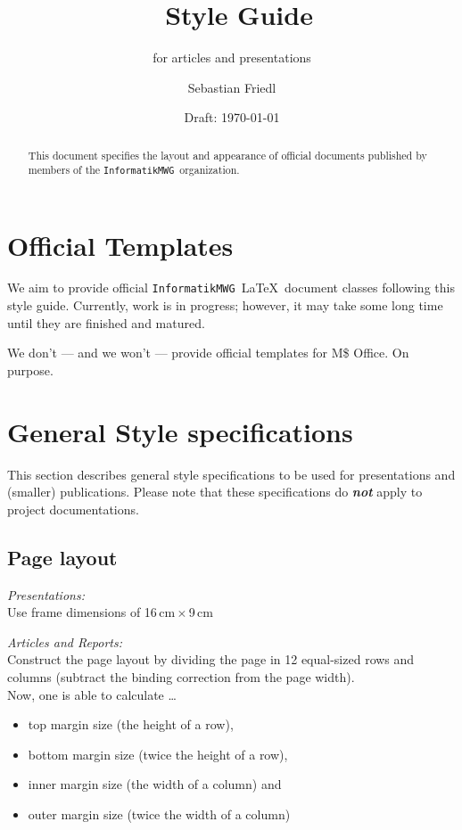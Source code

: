 \documentclass[DIV=12,abstracton]{scrartcl}
\title{\informatikMWG\ Style Guide}
\subtitle{for articles and presentations}
\author{Sebastian Friedl}
\date{Draft: \today}
\def\informatikMWG{\texttt{InformatikMWG}}
\begin{document}
    \maketitle

    \begin{abstract}
        This document specifies the layout and appearance of official documents published by members of the \informatikMWG\ organization.
    \end{abstract}
    
    \bigskip\bigskip\bigskip
    
    \section{Official Templates}
    We aim to provide official \informatikMWG\ \LaTeX\ document classes following this style guide. Currently, work is in progress; however, it may take some long time until they are finished and matured.

    \medskip
    We don't --- and we won't --- provide official templates for M\$ Office. On purpose.
    
    
    \section{General Style specifications}
    This section describes general style specifications to be used for presentations and (smaller) publications.
    Please note that these specifications do \emph{\textbf{not}} apply to project documentations.
    
    \subsection{Page layout}
    \textit{Presentations:} \\
    Use frame dimensions of 16\,cm\,$\times$\,9\,cm
    
    \medskip
    \textit{Articles and Reports:} \\
    Construct the page layout by dividing the page in 12 equal-sized rows and columns (subtract the binding correction from the page width). \\[\smallskipamount]
    Now, one is able to calculate \dots
    \begin{itemize}\itemsep0pt
        \item top margin size (the height of a row),
        \item bottom margin size (twice the height of a row),
        \item inner margin size (the width of a column) and
        \item outer margin size (twice the width of a column)
    \end{itemize}
\end{document}
